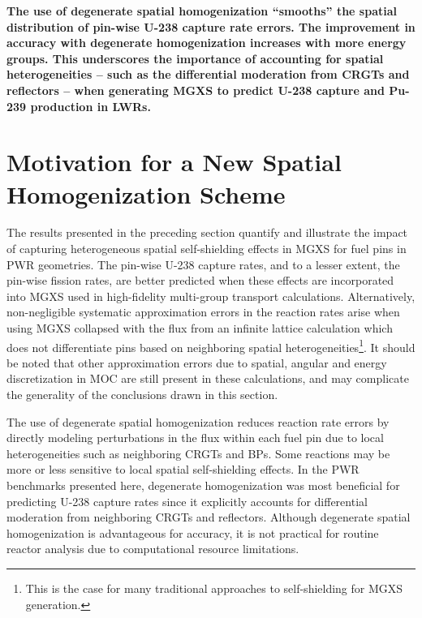 \begin{emphbox}
\textbf{The use of degenerate spatial homogenization ``smooths'' the spatial distribution of pin-wise U-238 capture rate errors. The improvement in accuracy with degenerate homogenization increases with more energy groups. This underscores the importance of accounting for spatial heterogeneities -- such as the differential moderation from \acp{CRGT} and reflectors -- when generating \ac{MGXS} to predict U-238 capture and Pu-239 production in \acp{LWR}.}
\end{emphbox}


\section{Motivation for a New Spatial Homogenization Scheme}
\label{sec:chap8-motivate}

The results presented in the preceding section quantify and illustrate the impact of capturing heterogeneous spatial self-shielding effects in \ac{MGXS} for fuel pins in \ac{PWR} geometries. The pin-wise U-238 capture rates, and to a lesser extent, the pin-wise fission rates, are better predicted when these effects are incorporated into \ac{MGXS} used in high-fidelity multi-group transport calculations. Alternatively, non-negligible systematic approximation errors in the reaction rates arise when using \ac{MGXS} collapsed with the flux from an infinite lattice calculation which does not differentiate pins based on neighboring spatial heterogeneities\footnote{This is the case for many traditional approaches to self-shielding for \ac{MGXS} generation.}. It should be noted that other approximation errors due to spatial, angular and energy discretization in \ac{MOC} are still present in these calculations, and may complicate the generality of the conclusions drawn in this section.

The use of degenerate spatial homogenization reduces reaction rate errors by directly modeling perturbations in the flux within each fuel pin due to local heterogeneities such as neighboring \acp{CRGT} and \acp{BP}. Some reactions may be more or less sensitive to local spatial self-shielding effects. In the \ac{PWR} benchmarks presented here, degenerate homogenization was most beneficial for predicting U-238 capture rates since it explicitly accounts for differential moderation from neighboring \acp{CRGT} and reflectors. Although degenerate spatial homogenization is advantageous for accuracy, it is not practical for routine reactor analysis due to computational resource limitations.

